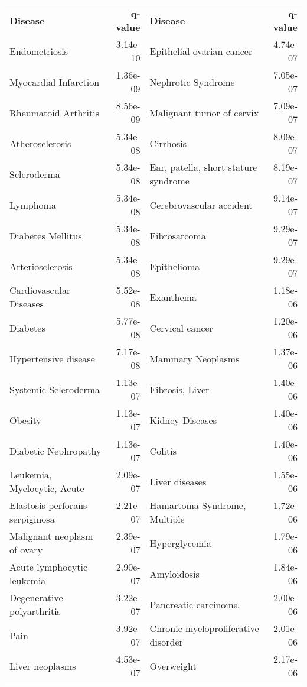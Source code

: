 \documentclass[fleqn,10pt]{SelfArx} %
\begin{document}
\begin{table}[ht]
	\centering
	\scriptsize
	\begin{tabularx}{\textwidth}{lRlR}
		\textbf{\color{white} Disease} & \textbf{\color{white} q-value} & \textbf{\color{white} Disease} & \textbf{\color{white} q-value} \\
		Endometriosis & 3.14e-10 & Epithelial ovarian cancer & 4.74e-07 \\ 
		Myocardial Infarction & 1.36e-09 & Nephrotic Syndrome & 7.05e-07 \\ 
		Rheumatoid Arthritis & 8.56e-09 & Malignant tumor of cervix & 7.09e-07 \\ 
		Atherosclerosis & 5.34e-08 & Cirrhosis & 8.09e-07 \\ 
		Scleroderma & 5.34e-08 & Ear, patella, short stature syndrome & 8.19e-07 \\ 
		Lymphoma & 5.34e-08 & Cerebrovascular accident & 9.14e-07 \\ 
		Diabetes Mellitus & 5.34e-08 & Fibrosarcoma & 9.29e-07 \\ 
		Arteriosclerosis & 5.34e-08 & Epithelioma & 9.29e-07 \\ 
		Cardiovascular Diseases & 5.52e-08 & Exanthema & 1.18e-06 \\ 
		Diabetes & 5.77e-08 & Cervical cancer & 1.20e-06 \\ 
		Hypertensive disease & 7.17e-08 & Mammary Neoplasms & 1.37e-06 \\ 
		Systemic Scleroderma & 1.13e-07 & Fibrosis, Liver & 1.40e-06 \\ 
		Obesity & 1.13e-07 & Kidney Diseases & 1.40e-06 \\ 
		Diabetic Nephropathy & 1.13e-07 & Colitis & 1.40e-06 \\ 
		Leukemia, Myelocytic, Acute & 2.09e-07 & Liver diseases & 1.55e-06 \\ 
		Elastosis perforans serpiginosa & 2.21e-07 & Hamartoma Syndrome, Multiple & 1.72e-06 \\ 
		Malignant neoplasm of ovary & 2.39e-07 & Hyperglycemia & 1.79e-06 \\ 
		Acute lymphocytic leukemia & 2.90e-07 & Amyloidosis & 1.84e-06 \\ 
		Degenerative polyarthritis & 3.22e-07 & Pancreatic carcinoma & 2.00e-06 \\ 
		Pain & 3.92e-07 & Chronic myeloproliferative disorder & 2.01e-06 \\ 
		Liver neoplasms & 4.53e-07 & Overweight & 2.17e-06 \\ 

\end{tabularx}
\end{table}
\end{document}

